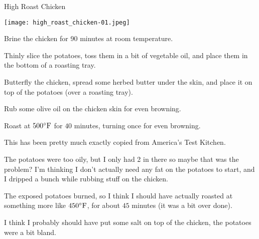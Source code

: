 \documentclass{recipe}
\begin{document}
\begin{recipe}{High Roast Chicken}

  \begin{ingredients}
  \end{ingredients}

  \begin{images}
    \begin{image}
      \texttt{[image: high\_roast\_chicken-01.jpeg]}
    \end{image}
  \end{images}

  \begin{steps}
  \item Brine the chicken for 90 minutes at room temperature.
  \item Thinly slice the potatoes, toss them in a bit of vegetable
    oil, and place them in the bottom of a roasting tray.
  \item Butterfly the chicken, spread some herbed butter under the
    skin, and place it on top of the potatoes (over a roasting tray).
  \item Rub some olive oil on the chicken skin for even browning.
  \item Roast at $500^{\circ}\mathrm{F}$ for $40$ minutes, turning once for even
    browning.
  \end{steps}

  \begin{notes}
  \item This has been pretty much exactly copied from America's Test
    Kitchen.
  \item The potatoes were too oily, but I only had 2 in there so maybe
    that was the problem?  I'm thinking I don't actually need any fat
    on the potatoes to start, and I dripped a bunch while rubbing
    stuff on the chicken.
  \item The exposed potatoes burned, so I think I should have actually
    roasted at something more like $450^{\circ}\mathrm{F}$, for about $45$ minutes
    (it was a bit over done).
  \item I think I probably should have put some salt on top of the
    chicken, the potatoes were a bit bland.
  \end{notes}
\end{recipe}
\end{document}
